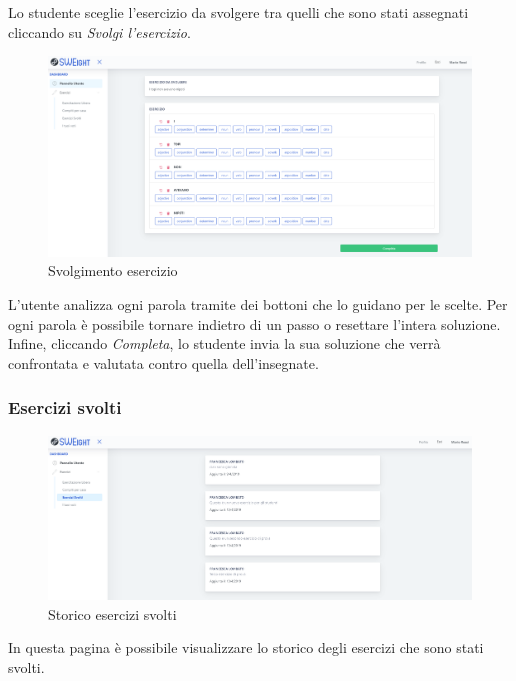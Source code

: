 		  Lo studente sceglie l'esercizio da svolgere tra quelli che sono stati assegnati cliccando su \textit{Svolgi l'esercizio}.   
       
        	\begin{figure}[H]
            	\centering
            	\includegraphics[width=17cm]{sez/img/studente/svolgimentoesercizio.PNG} 
            	\caption{Svolgimento esercizio}\label{fig:1}
        	\end{figure}      
          L'utente analizza ogni parola tramite dei bottoni che lo guidano per le scelte. Per ogni parola è possibile tornare indietro di un passo o resettare l'intera soluzione. Infine, cliccando \textit{Completa}, lo studente invia la sua soluzione che verrà confrontata e valutata contro quella dell'insegnate.
        
        
        
        
        \subsubsection{Esercizi svolti}
        	\begin{figure}[H]
            	\centering
            	\includegraphics[width=17cm]{sez/img/studente/esercizisvolti.PNG} 
            	\caption{Storico esercizi svolti}\label{fig:1}
        	\end{figure}
          In questa pagina è possibile visualizzare lo storico degli esercizi che sono stati svolti.
        
